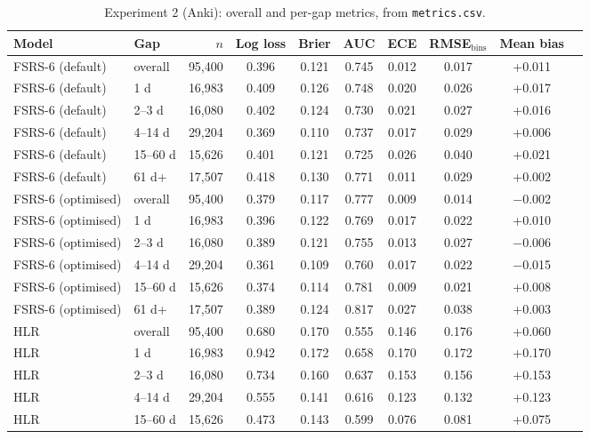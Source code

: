 \begin{table}[htbp]
  \centering
  \footnotesize\setlength{\tabcolsep}{3pt}
  \caption[Experiment 2: per-gap metrics]{Experiment 2 (Anki): overall and per-gap metrics, from \texttt{metrics.csv}.}
  \label{tab:appB-anki}
  \begin{tabular}{@{}llrccccccc@{}}
    \toprule
    Model & Gap & $n$ & Log loss & Brier & AUC & ECE & RMSE$_{\mathrm{bins}}$ & Mean bias \\
    \midrule
    FSRS-6 (default) & overall & 95,400 & 0.396 & 0.121 & 0.745 & 0.012 & 0.017 & +0.011 \\
    FSRS-6 (default) & 1 d & 16,983 & 0.409 & 0.126 & 0.748 & 0.020 & 0.026 & +0.017 \\
    FSRS-6 (default) & 2--3 d & 16,080 & 0.402 & 0.124 & 0.730 & 0.021 & 0.027 & +0.016 \\
    FSRS-6 (default) & 4--14 d & 29,204 & 0.369 & 0.110 & 0.737 & 0.017 & 0.029 & +0.006 \\
    FSRS-6 (default) & 15--60 d & 15,626 & 0.401 & 0.121 & 0.725 & 0.026 & 0.040 & +0.021 \\
    FSRS-6 (default) & 61 d+ & 17,507 & 0.418 & 0.130 & 0.771 & 0.011 & 0.029 & +0.002 \\
    \midrule
    FSRS-6 (optimised) & overall & 95,400 & 0.379 & 0.117 & 0.777 & 0.009 & 0.014 & $-$0.002 \\
    FSRS-6 (optimised) & 1 d & 16,983 & 0.396 & 0.122 & 0.769 & 0.017 & 0.022 & +0.010 \\
    FSRS-6 (optimised) & 2--3 d & 16,080 & 0.389 & 0.121 & 0.755 & 0.013 & 0.027 & $-$0.006 \\
    FSRS-6 (optimised) & 4--14 d & 29,204 & 0.361 & 0.109 & 0.760 & 0.017 & 0.022 & $-$0.015 \\
    FSRS-6 (optimised) & 15--60 d & 15,626 & 0.374 & 0.114 & 0.781 & 0.009 & 0.021 & +0.008 \\
    FSRS-6 (optimised) & 61 d+ & 17,507 & 0.389 & 0.124 & 0.817 & 0.027 & 0.038 & +0.003 \\
    \midrule
    HLR & overall & 95,400 & 0.680 & 0.170 & 0.555 & 0.146 & 0.176 & +0.060 \\
    HLR & 1 d & 16,983 & 0.942 & 0.172 & 0.658 & 0.170 & 0.172 & +0.170 \\
    HLR & 2--3 d & 16,080 & 0.734 & 0.160 & 0.637 & 0.153 & 0.156 & +0.153 \\
    HLR & 4--14 d & 29,204 & 0.555 & 0.141 & 0.616 & 0.123 & 0.132 & +0.123 \\
    HLR & 15--60 d & 15,626 & 0.473 & 0.143 & 0.599 & 0.076 & 0.081 & +0.075 \\

\end{tabular}
\end{table}
